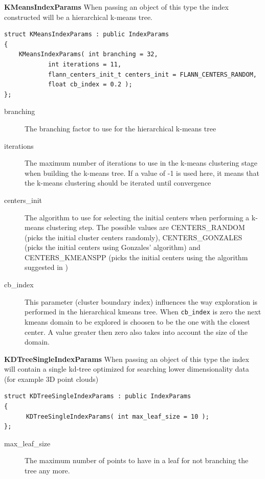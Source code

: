 \documentclass[letter,10pt]{article}
\begin{document}
\begin{description}
\textbf{KMeansIndexParams} When passing an object of this type the index constructed will be a hierarchical k-means tree. 
\begin{Verbatim}[fontsize=\footnotesize]
struct KMeansIndexParams : public IndexParams
{
	KMeansIndexParams( int branching = 32,
			int iterations = 11,
			flann_centers_init_t centers_init = FLANN_CENTERS_RANDOM,
			float cb_index = 0.2 );
};
\end{Verbatim}
\begin{description}
\item[branching]{ The branching factor to use for the hierarchical k-means tree }
\item[iterations]{ The maximum number of iterations to use in the k-means clustering 
		    stage when building the k-means tree. If a value of -1 is used here, it means
		    that the k-means clustering should be iterated until convergence}
\item[centers\_init]{ The algorithm to use for selecting the initial
		  centers when performing a k-means clustering step. The possible values are
		  CENTERS\_RANDOM (picks the initial cluster centers randomly), CENTERS\_GONZALES (picks the
		  initial centers using Gonzales' algorithm) and CENTERS\_KMEANSPP (picks the initial
		centers using the algorithm suggested in \cite{arthur_kmeanspp_2007}) }
\item[cb\_index]{ This parameter (cluster boundary index) influences the
		  way exploration is performed in the hierarchical kmeans tree. When \texttt{cb\_index} is zero
		  the next kmeans domain to be explored is choosen to be the one with the closest center. 
		  A value greater then zero also takes into account the size of the domain.}
\end{description}

\textbf{KDTreeSingleIndexParams} When passing an object of this type the index will contain a single kd-tree
optimized for searching lower dimensionality data (for example 3D point clouds)
\begin{Verbatim}[fontsize=\footnotesize]
struct KDTreeSingleIndexParams : public IndexParams
{
      KDTreeSingleIndexParams( int max_leaf_size = 10 );
};
\end{Verbatim}
\begin{description}
 \item[max\_leaf\_size] The maximum number of points to have in a leaf for not branching the tree any more.
\end{description}



\end{description}
\end{document}
